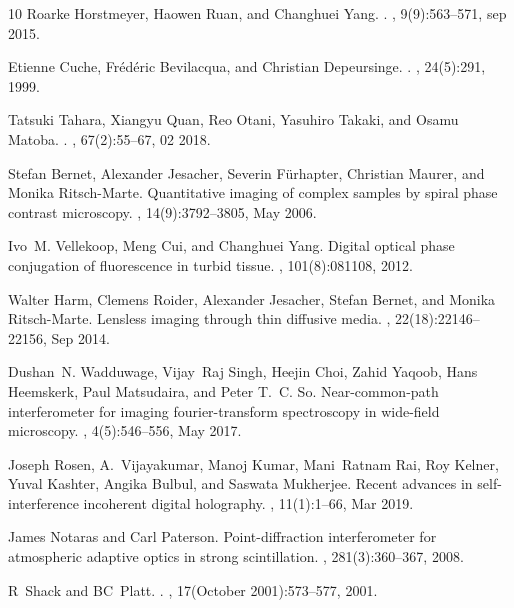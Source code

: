 \documentclass[10pt,twocolumn,twoside,letterpaper]{article}
\begin{document}
\begin{thebibliography}{10}
Roarke Horstmeyer, Haowen Ruan, and Changhuei Yang.
.
, 9(9):563--571, sep 2015.

Etienne Cuche, Fr{\'{e}}d{\'{e}}ric Bevilacqua, and Christian Depeursinge.
.
, 24(5):291, 1999.

Tatsuki Tahara, Xiangyu Quan, Reo Otani, Yasuhiro Takaki, and Osamu Matoba.
.
, 67(2):55--67, 02 2018.

Stefan Bernet, Alexander Jesacher, Severin F\"{u}rhapter, Christian Maurer, and
  Monika Ritsch-Marte.
\newblock Quantitative imaging of complex samples by spiral phase contrast
  microscopy.
, 14(9):3792--3805, May 2006.

Ivo~M. Vellekoop, Meng Cui, and Changhuei Yang.
\newblock Digital optical phase conjugation of fluorescence in turbid tissue.
, 101(8):081108, 2012.

Walter Harm, Clemens Roider, Alexander Jesacher, Stefan Bernet, and Monika
  Ritsch-Marte.
\newblock Lensless imaging through thin diffusive media.
, 22(18):22146--22156, Sep 2014.

Dushan~N. Wadduwage, Vijay~Raj Singh, Heejin Choi, Zahid Yaqoob, Hans
  Heemskerk, Paul Matsudaira, and Peter T.~C. So.
\newblock Near-common-path interferometer for imaging fourier-transform
  spectroscopy in wide-field microscopy.
, 4(5):546--556, May 2017.

Joseph Rosen, A.~Vijayakumar, Manoj Kumar, Mani~Ratnam Rai, Roy Kelner, Yuval
  Kashter, Angika Bulbul, and Saswata Mukherjee.
\newblock Recent advances in self-interference incoherent digital holography.
, 11(1):1--66, Mar 2019.

James Notaras and Carl Paterson.
\newblock Point-diffraction interferometer for atmospheric adaptive optics in
  strong scintillation.
, 281(3):360--367, 2008.

R~Shack and BC~Platt.
.
, 17(October 2001):573--577, 2001.


\end{thebibliography}
\end{document}
